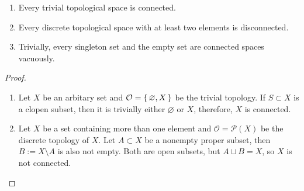 %
%
\begin{thmbox}
    \begin{proposition}
        \begin{enumerate}
            \item Every trivial topological space is connected.
            \item Every discrete topological space with at least two elements is disconnected.
            \item Trivially, every singleton set and the empty set are connected spaces vacuously.
        \end{enumerate}
    \end{proposition}
\end{thmbox}
%
\begin{proof}
    \begin{enumerate}
        \item Let \(X\) be an arbitary set and \(\mathcal{O} = \left\{\, \varnothing, X \,\right\}\) be the trivial topology. If \(S \subset X\) is a clopen subset, then it is trivially either \(\varnothing\) or \(X\), therefore, \(X\) is connected.
        \item Let \(X\) be a set containing more than one element and \(\mathcal{O} = \mathcal{P}(X)\) be the discrete topology of \(X\). Let \(A \subset X\) be a nonempty proper subset, then \(B := X \setminus A\) is also not empty. Both are open subsets, but \(A \sqcup B = X\), so \(X\) is not connected.
    \end{enumerate}
\end{proof}

